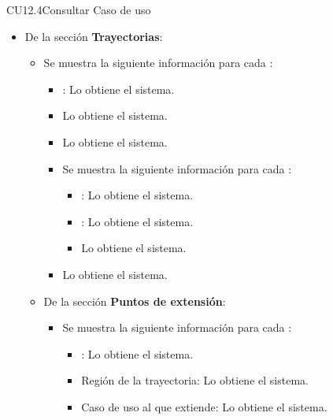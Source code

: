 \begin{UseCase}{CU12.4}{Consultar Caso de uso}
{\begin{itemize}
\begin{itemize}
					\end{itemize}
				\item De la sección \textbf{Trayectorias}:
					\begin{itemize}
						\item Se muestra la siguiente información para cada :
							\begin{itemize}
								\item {}: Lo obtiene el sistema.
								\item {} Lo obtiene el sistema.
								\item {} Lo obtiene el sistema.
								\item Se muestra la siguiente información para cada :
									\begin{itemize}
										\item {}: Lo obtiene el sistema.
										\item {}: Lo obtiene el sistema.
										\item {} Lo obtiene el sistema.
									\end{itemize}
								\item {} Lo obtiene el sistema.
							\end{itemize}
						\item De la sección \textbf{Puntos de extensión}:
							\begin{itemize}
								\item Se muestra la siguiente información para cada :
									\begin{itemize}
										\item {}: Lo obtiene el sistema.
										\item Región de la trayectoria: Lo obtiene el sistema.
										\item Caso de uso al que extiende: Lo obtiene el sistema.
									\end{itemize}
							\end{itemize}
					\end{itemize}
		\end{itemize}}
	\end{UseCase}
